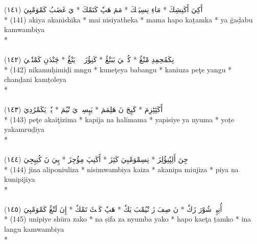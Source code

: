 \documentclass[a4paper, 12pt]{report}
\begin{document}
\begin{center}
\textarabic{(١٤١) \textcolor{mygreen}{أَكِيَ أَكَنِشِكَ  * مَاءِ نِسِيَثٖكَ  * مَمَ هَپٗ كَتَمْكَ  * يَ غَضَبُ كَمْوَمْبِيَ }} \\* 
(141) akiya akanishika  * mai nisiyatheka  * mama hapo kaṯamka  * ya ḡaḍabu kamwambiya  \\* 
 \\ 
\\[8mm] 

\textarabic{(١٤٢) \textcolor{mygreen}{نِكَمُحِمِدِ مْنْڠُ  * كُنٖٹٖيَ بَبَنْڠُ  * كَنِؤُزَ پٖٹٖ يَنْڠُ  * چَنْدَنِ كَمْتٗلٖيَ }} \\* 
(142) nikamuḥimiḏi mngu  * kuneţeya babangu  * kaniuza peţe yangu  * chanḏani kamṯoleya  \\* 
 \\ 
\\[8mm] 

\textarabic{(١٤٣) \textcolor{mygreen}{پٖٹٖ أَكَئِٹِزِمَ  * كَپِجَ نَ هَلِمَمَ  * يَپِسِيٖ يَ نْيُمَ  * يٗتٖ يَكَمْرُدِيَ }} \\* 
(143) peţe akaiţizima  * kapija na halimama  * yapisiye ya nyuma  * yoṯe yakamruḏiya  \\* 
 \\ 
\\[8mm] 

\textarabic{(١٤٤) \textcolor{mygreen}{جِنَ أَلِپٗنِؤُلِزَ  * نِسِمْوَمْبِيَ كَئِزَ  * أَكَنِپَ مِؤُجِزَ  * پِيَ نَ كُنِپِجِيَ }} \\* 
(144) jina aliponiuliza  * nisimwambiya kaiza  * akanipa miujiza  * piya na kunipijiya  \\* 
 \\ 
\\[8mm] 

\textarabic{(١٤٥) \textcolor{mygreen}{أُنِپِيٖ شُوْرَ زَكٗ  * نَ صِفَ زَ نْيُمْبَ يَكٗ  * هَپٗ كَئٖٹَ تَمْكٗ  * إِنَ لَنْڠُ كَمْوَمْبِيَ }} \\* 
(145) unipiye shūra zako  * na ṣifa za nyumba yako  * hapo kaeţa ṯamko  * ina langu kamwambiya  \\* 
 \\ 
\\[8mm] 


\end{center}
\end{document}
